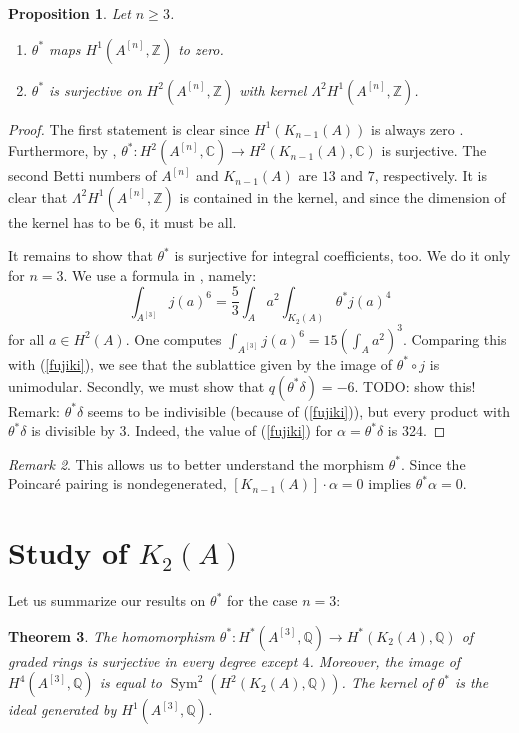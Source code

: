 \documentclass{amsart}
\DeclareMathOperator{\Sym}{Sym}
\newcommand{\hilb}[1]{^{[#1]}}
\newcommand{\kum}[2]{K_{ #2 }( #1 )}
\newcommand{\C}{\mathbb{C}}
\newcommand{\Q}{\mathbb{Q}}
\newcommand{\Z}{\mathbb{Z}}
\theoremstyle{plain}
\newtheorem{theorem}{Theorem}[section]
\newtheorem{proposition}[theorem]{Proposition}
\theoremstyle{definition}
\theoremstyle{remark}
\newtheorem{remark}[theorem]{Remark}
\begin{document}
\begin{proposition}Let $n\geq 3$.
\begin{enumerate} 
 \item $\theta^*$ maps $H^1(A\hilb{n},\Z)$ to zero.
 \item $\theta^*$ is surjective on $H^2(A\hilb{n},\Z)$ with kernel $\Lambda^2H^1(A\hilb{n},\Z)$.
\end{enumerate}
\end{proposition}
\begin{proof}
The first statement is clear since $H^1(\kum{A}{n-1})$ is always zero \cite[Thm.~3]{Beauville}. Furthermore, by \cite[Sect.~7]{Beauville}, $\theta^{\ast} : H^2(A\hilb{n},\C) \rightarrow H^2(\kum{A}{n-1},\C)$ is surjective. The second Betti numbers of $A\hilb{n}$ and $\kum{A}{n-1}$ are $13$ and $7$, respectively. It is clear that $\Lambda^2H^1(A\hilb{n},\Z)$ is contained in the kernel, and since the dimension of the kernel has to be $6$, it must be all.

It remains to show that $\theta^*$  is surjective for integral coefficients, too. We do it only for $n=3$. We use a formula in \cite[p. 8]{Britze}, namely:
\begin{equation} \int_{A\hilb{3}}j(a)^6 = \frac{5}{3} \int_A a^2 \int_{\kum{A}{2}} \theta^* j(a)^4
\end{equation}
for all $a\in H^2(A)$. One computes $\int_{A\hilb{3}}j(a)^6 = 15 \left(\int_A a^2\right)^3$. Comparing this with (\ref{fujiki}), we see that the sublattice given by the image of $\theta^*\circ j$ is unimodular. Secondly, we must show that $q(\theta^*\delta) = -6$. TODO: show this! 
Remark: $\theta^*\delta$ seems to be indivisible (because of (\ref{fujiki})), but every product with $\theta^*\delta$ is divisible by 3. Indeed, the value of (\ref{fujiki}) for $\alpha=\theta^*\delta$ is 324.
\end{proof}


\begin{remark}
This allows us to better understand the morphism $\theta^*$. Since the Poincar\'e pairing is nondegenerated, $[\kum{A}{n-1}]\cdot \alpha=0$ implies $\theta^* \alpha =0$.
\end{remark}
\section{Study of $\kum{A}{2}$}
Let us summarize our results on $\theta^*$ for the case $n=3$:
\begin{theorem}
The homomorphism $\theta^* : H^*(A\hilb{3},\Q)\rightarrow H^*(\kum{A}{2},\Q)$ of graded rings is surjective in every degree except $4$. Moreover, the image of $H^4(A\hilb{3},\Q)$ is equal to $\Sym^2(H^2(\kum{A}{2},\Q))$. 
The kernel of $\theta^*$ is the ideal generated by $H^1(A\hilb{3},\Q)$.
\end{theorem}
\end{document}
